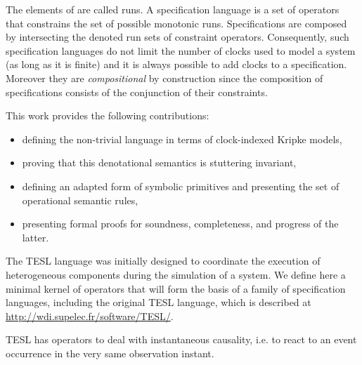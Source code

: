 \begin{isabellebody}
\begin{isamarkuptext}
\end{isamarkuptext}\isamarkuptrue%
%
\begin{isamarkuptext}%
The elements of \isa{{\isasymSigma}\isactrlsup {\isasyminfinity}} are called runs. A specification language is a set of 
  operators that constrains the set of possible monotonic runs. Specifications are composed by 
  intersecting the denoted run sets of constraint operators.
  Consequently, such specification languages do not limit the number of clocks used to model a 
  system (as long as it is finite) and it is always possible to add clocks to a specification. 
  Moreover they are \emph{compositional} by construction since the composition of specifications 
  consists of the conjunction of their constraints.%
\end{isamarkuptext}\isamarkuptrue%
%
\begin{isamarkuptext}%
This work provides the following contributions:

%
\begin{itemize}%
\item defining the non-trivial language  in terms of clock-indexed Kripke models, 

\item proving that this denotational semantics is stuttering invariant,

\item defining an adapted form of symbolic primitives and presenting the set of operational 
semantic rules,

\item presenting formal proofs for soundness, completeness, and progress of the latter.%
\end{itemize}%
\end{isamarkuptext}\isamarkuptrue%
%
\isadelimdocument
%
\endisadelimdocument
%
\isatagdocument
%
\isamarkuptrue%
%
\endisatagdocument
{\isafolddocument}%
%
\isadelimdocument
%
\endisadelimdocument
%
\begin{isamarkuptext}%
The TESL language \cite{BouJacHarPro2014MEMOCODE} was initially designed to coordinate the
  execution of heterogeneous components during the simulation of a system. We define here a minimal
  kernel of operators that will form the basis of a family of specification languages, including the
  original TESL language, which is described at \url{http://wdi.supelec.fr/software/TESL/}.%
\end{isamarkuptext}\isamarkuptrue%
%
\isadelimdocument
%
\endisadelimdocument
%
\isatagdocument
%
\isamarkuptrue%
%
\endisatagdocument
{\isafolddocument}%
%
\isadelimdocument
%
\endisadelimdocument
%
\begin{isamarkuptext}%
TESL has operators to deal with instantaneous causality, i.e. to react to an event occurrence
in the very same observation instant.


\end{isamarkuptext}
\end{isabellebody}

